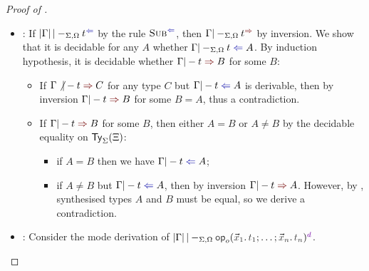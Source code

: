 \begin{proof}[Proof of {}]
\begin{itemize}
    \item {}: If $\erase{\Gamma} |-_{\Sigma, \Omega}t^{\chk}$ by the rule $\ChkRule{Sub}$, then $\Gamma |-_{\Sigma, \Omega} t^{\syn}$ by inversion.
      We show that it is decidable for any $A$ whether $\Gamma |-_{\Sigma, \Omega} t \chk A$.
      By induction hypothesis, it is decidable whether $\Gamma |- t \syn B$ for some $B$:
      \begin{itemize}
        \item If $\Gamma \not|- t \syn C$ for any type $C$ but $\Gamma |- t \chk A$ is derivable, then by inversion $\Gamma |- t \syn B$ for some $B = A$, thus a contradiction.
        \item If $\Gamma |- t \syn B$ for some $B$, then either $A = B$ or $A \neq B$ by the decidable equality on $\mathsf{Ty}_{\Sigma}(\Xi)$: 
          \begin{itemize}
            \item if $A = B$ then we have\/ $\Gamma |- t \chk A$;
            \item if $A \neq B$ but $\Gamma |- t \chk A$, then by inversion $\Gamma |- t \syn A$.
              However, by , synthesised types $A$ and $B$ must be equal, so we derive a contradiction.
          \end{itemize}
      \end{itemize}
    \item {}:
      Consider the mode derivation of\/ $\erase{\Gamma} |-_{\Sigma, \Omega} \tmOpts^{\dir{d}}$.
%
%
  \end{itemize}
\end{proof}

